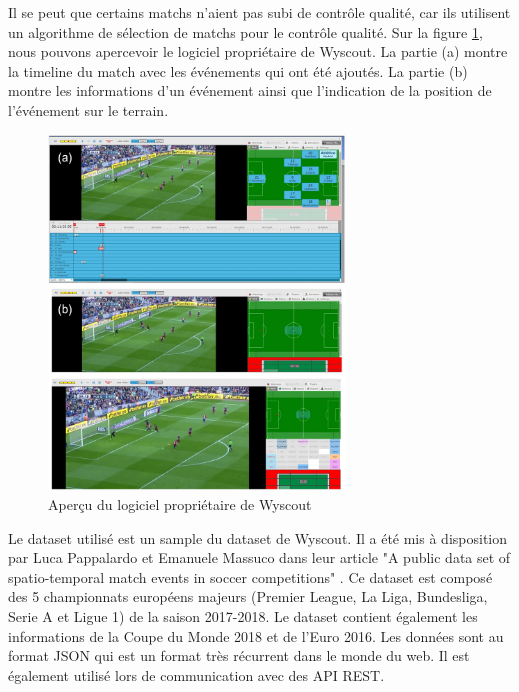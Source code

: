 \documentclass[12pt]{article}
\begin{document}
Il se peut que certains matchs n'aient pas subi de contrôle qualité, car ils utilisent un algorithme de sélection de matchs pour le contrôle qualité.
Sur la figure \ref{fig:logiciel_proprietaire}, nous pouvons apercevoir le logiciel propriétaire de Wyscout.
La partie (a) montre la timeline du match avec les événements qui ont été ajoutés.
La partie (b) montre les informations d'un événement ainsi que l'indication de la position de l'événement sur le terrain.
\begin{figure}[htp]
    \centering
    \includegraphics[width=0.7\textwidth]{img/logiciel_proprietaire.png}
    \caption{Aperçu du logiciel propriétaire de Wyscout}
    \label{fig:logiciel_proprietaire}
\end{figure}
\newline\newline
Le dataset utilisé est un sample du dataset de Wyscout.
Il a été mis à disposition par Luca Pappalardo et Emanuele Massuco dans leur article "A public data set of spatio-temporal match events in soccer competitions" \cite{pappalardoPublicDataSet2019}.
\newline
Ce dataset est composé des 5 championnats européens majeurs (Premier League, La Liga, Bundesliga, Serie A et Ligue 1) de la saison 2017-2018.
Le dataset contient également les informations de la Coupe du Monde 2018 et de l'Euro 2016.
Les données sont au format JSON qui est un format très récurrent dans le monde du web. Il est également utilisé lors de communication avec des API REST.
\end{document}
